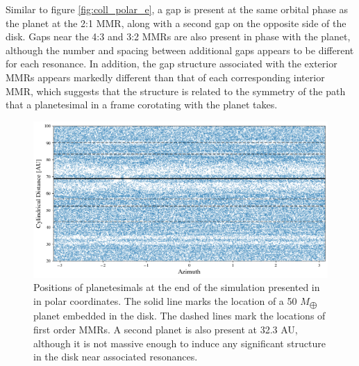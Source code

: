 \documentclass[twocolumn]{aastex63}
\begin{document}
Similar to figure \ref{fig:coll_polar_e}, a gap is present at the same orbital phase as the planet at the 2:1 MMR, along with a second gap on
the opposite side of the disk. Gaps near the 4:3 and 3:2 MMRs are also present in phase with the planet, although the number and spacing between 
additional gaps appears to be different for each resonance. In addition, the gap structure associated with the exterior MMRs appears markedly
different than that of each corresponding interior MMR, which suggests that the structure is related to the symmetry of the path that a planetesimal
in a frame corotating with the planet takes.

\begin{figure}
    \includegraphics[width=\textwidth]{figures/boley_rtheta}
    \caption{Positions of planetesimals at the end of the simulation presented in \citet{2017ApJ...850..103B} in polar coordinates. The solid line marks the location of a 50 $M_{\bigoplus}$ planet embedded in the disk. The dashed lines mark the locations of first order MMRs. A second planet is also present at 32.3 AU, although it is not massive enough to induce any significant structure in the disk near associated resonances.\label{fig:boley_rtheta}}
\end{figure}
\end{document}

